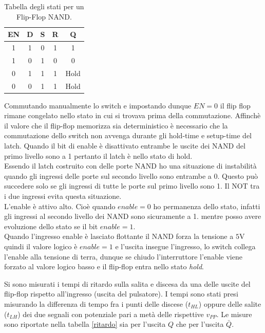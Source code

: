 \documentclass[10pt,a4paper]{article}
\begin{document}
\begin{table}[!htb]
\centering
\begin{tabular}{|c|c|c|c|c|}
\hline 
EN & D & S & R & Q\\ 
\hline 
1 & 1 & 0 & 1 & 1\\ 
\hline 
1 & 0 & 1 & 0 & 0\\ 
\hline 
0 & 1 & 1 & 1 & Hold\\ 
\hline 
0 & 0 & 1 & 1 & Hold\\ 
\hline 
\end{tabular}
\caption{Tabella degli stati per un Flip-Flop NAND. \label{stati2}}
\end{table}


Commutando manualmente lo switch e impostando dunque $EN = 0$ il flip flop rimane congelato nello stato in cui si trovava prima della commutazione.
Affinchè il valore che il flip-flop memorizza sia deterministico è necessario che la commutazione dello switch non avvenga durante gli hold-time e setup-time del latch. Quando il bit di enable è disattivato entrambe le uscite dei NAND del primo livello sono a 1 pertanto il latch è nello stato di hold.\\

Essendo il latch costruito con delle porte NAND ho una situazione di instabilità quando gli ingressi delle porte sul secondo livello sono entrambe a 0. Questo può succedere solo se gli ingressi di tutte le porte sul primo livello sono 1. Il NOT tra i due ingressi evita questa situazione.\\
L'enable è attivo alto. Cioè quando $enable = 0$ ho permanenza dello stato, infatti gli ingressi al secondo livello dei NAND sono sicuramente a 1. mentre posso avere evoluzione dello stato se il bit $enable = 1$.\\
Quando l'ingresso enable è lasciato flottante il NAND forza la tensione a $5$V quindi il valore logico è   $enable = 1$ e l'uscita insegue l'ingresso, lo switch collega l'enable alla tensione di terra, dunque se chiudo l'interruttore l'enable viene forzato al valore logico basso e il flip-flop entra nello stato \emph{hold}.%

Si sono misurati i tempi di ritardo sulla salita e discesa da una delle uscite del flip-flop rispetto all'ingresso (uscita del pulsatore). I tempi sono stati presi misurando la differenza di tempo fra i punti  delle discese ($t_{HL}$) oppure delle salite ($t_{LH}$) dei due segnali con potenziale pari a metà delle rispettive $v_{PP}$. Le misure sono riportate nella tabella \ref{ritardo} sia per l'uscita $Q$ che per l'uscita $\bar{Q}$.
\end{document}
